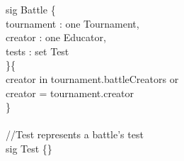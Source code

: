 \documentclass{article}
\begin{document}
{\color{blue}
sig
\color{black}
Battle \{\\
\-\hspace{1cm}    tournament : \color{blue} one \color{black} Tournament,\\
\-\hspace{1cm}    creator : \color{blue} one \color{black} Educator,\\
\-\hspace{1cm}	tests : \color{blue} set \color{black} Test\\
\}\{\\
\-\hspace{1cm}	creator \color{blue} in \color{black} tournament.battleCreators \color{blue} or \color{black}\\
\-\hspace{1cm}	creator \color{blue} = \color{black} tournament.creator\\
\}\\
\color{gray}
\\
//Test represents a battle's test\\
\color{blue}
sig
\color{black}
Test \{\}

\newpage

}
\end{document}
